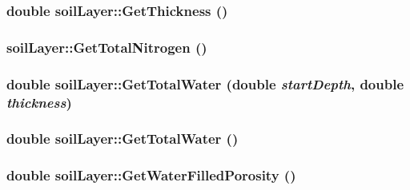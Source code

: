 \label{classsoil_layer_a4767a2f084104f8c8407af7a6c7d7513}
\hypertarget{classsoil_layer_a2505c534964ced0b3d5a77c9c9ef3424}{
\subsubsection[{GetThickness}]{\setlength{\rightskip}{0pt plus 5cm}double soilLayer::GetThickness ()}}
\label{classsoil_layer_a2505c534964ced0b3d5a77c9c9ef3424}
\hypertarget{classsoil_layer_a8140893eff5a44a15464a49ff837f1de}{
\subsubsection[{GetTotalNitrogen}]{ soilLayer::GetTotalNitrogen ()}}
\label{classsoil_layer_a8140893eff5a44a15464a49ff837f1de}
\hypertarget{classsoil_layer_a849537127926fa5f52156405ce315867}{
\subsubsection[{GetTotalWater}]{\setlength{\rightskip}{0pt plus 5cm}double soilLayer::GetTotalWater (double {\em startDepth}, \/  double {\em thickness})}}
\label{classsoil_layer_a849537127926fa5f52156405ce315867}
\hypertarget{classsoil_layer_af01077dc70989747d1f48ba46bb0556c}{
\subsubsection[{GetTotalWater}]{\setlength{\rightskip}{0pt plus 5cm}double soilLayer::GetTotalWater ()}}
\label{classsoil_layer_af01077dc70989747d1f48ba46bb0556c}
\hypertarget{classsoil_layer_ac492720707c5061523bb4996b522107f}{
\subsubsection[{GetWaterFilledPorosity}]{\setlength{\rightskip}{0pt plus 5cm}double soilLayer::GetWaterFilledPorosity ()}}
